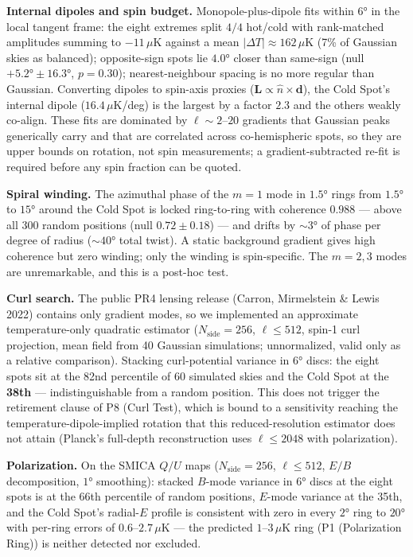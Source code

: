\documentclass[
]{article}
\begin{document}
\textbf{Internal dipoles and spin budget.} Monopole-plus-dipole fits
within \(6°\) in the local tangent frame: the eight extremes split
\(4/4\) hot/cold with rank-matched amplitudes summing to \(-11\,\mu\)K
against a mean \(|\Delta T| \approx 162\,\mu\)K (7\% of Gaussian skies
as balanced); opposite-sign spots lie \(4.0°\) closer than same-sign
(null \(+5.2° \pm 16.3°\), \(p = 0.30\)); nearest-neighbour spacing is
no more regular than Gaussian. Converting dipoles to spin-axis proxies
(\(\mathbf{L} \propto \hat{n} \times \mathbf{d}\)), the Cold Spot's
internal dipole (\(16.4\,\mu\)K/deg) is the largest by a factor \(2.3\)
and the others weakly co-align. These fits are dominated by
\(\ell \sim 2\)--\(20\) gradients that Gaussian peaks generically carry
and that are correlated across co-hemispheric spots, so they are upper
bounds on rotation, not spin measurements; a gradient-subtracted re-fit
is required before any spin fraction can be quoted.

\textbf{Spiral winding.} The azimuthal phase of the \(m = 1\) mode in
\(1.5°\) rings from \(1.5°\) to \(15°\) around the Cold Spot is locked
ring-to-ring with coherence \(0.988\) --- above all 300 random positions
(null \(0.72 \pm 0.18\)) --- and drifts by \(\sim\!3°\) of phase per
degree of radius (\(\sim\!40°\) total twist). A static background
gradient gives high coherence but zero winding; only the winding is
spin-specific. The \(m = 2, 3\) modes are unremarkable, and this is a
post-hoc test.

\textbf{Curl search.} The public PR4 lensing release (Carron,
Mirmelstein \& Lewis 2022) contains only gradient modes, so we
implemented an approximate temperature-only quadratic estimator
(\(N_{\text{side}} = 256\), \(\ell \leq 512\), spin-1 curl projection,
mean field from 40 Gaussian simulations; unnormalized, valid only as a
relative comparison). Stacking curl-potential variance in \(6°\) discs:
the eight spots sit at the 82nd percentile of 60 simulated skies and the
Cold Spot at the \textbf{38th} --- indistinguishable from a random
position. This does not trigger the retirement clause of P8 (Curl Test),
which is bound to a sensitivity reaching the temperature-dipole-implied
rotation that this reduced-resolution estimator does not attain
(Planck's full-depth reconstruction uses \(\ell \leq 2048\) with
polarization).

\textbf{Polarization.} On the SMICA \(Q/U\) maps
(\(N_{\text{side}} = 256\), \(\ell \leq 512\), \(E/B\) decomposition,
\(1°\) smoothing): stacked \(B\)-mode variance in \(6°\) discs at the
eight spots is at the 66th percentile of random positions, \(E\)-mode
variance at the 35th, and the Cold Spot's radial-\(E\) profile is
consistent with zero in every \(2°\) ring to \(20°\) with per-ring
errors of \(0.6\)--\(2.7\,\mu\)K --- the predicted \(1\)--\(3\,\mu\)K
ring (P1 (Polarization Ring)) is neither detected nor excluded.
\end{document}
